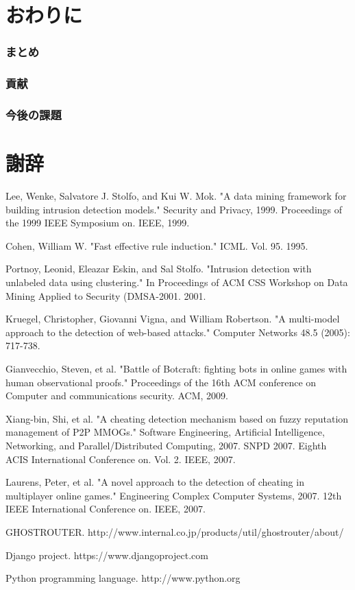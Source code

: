 \documentclass[a4paper,11pt]{jsarticle}
\begin{document}
\newpage
\part{おわりに}
\section{まとめ}
\section{貢献}
\section{今後の課題}

\newpage
\part*{謝辞}



\newpage
\begin{thebibliography}{99}

Lee, Wenke, Salvatore J. Stolfo, and Kui W. Mok. "A data mining framework for building intrusion detection models." Security and Privacy, 1999. Proceedings of the 1999 IEEE Symposium on. IEEE, 1999.

Cohen, William W. "Fast effective rule induction." ICML. Vol. 95. 1995.

Portnoy, Leonid, Eleazar Eskin, and Sal Stolfo. "Intrusion detection with unlabeled data using clustering." In Proceedings of ACM CSS Workshop on Data Mining Applied to Security (DMSA-2001. 2001.

Kruegel, Christopher, Giovanni Vigna, and William Robertson. "A multi-model approach to the detection of web-based attacks." Computer Networks 48.5 (2005): 717-738.

Gianvecchio, Steven, et al. "Battle of Botcraft: fighting bots in online games with human observational proofs." Proceedings of the 16th ACM conference on Computer and communications security. ACM, 2009.

Xiang-bin, Shi, et al. "A cheating detection mechanism based on fuzzy reputation management of P2P MMOGs." Software Engineering, Artificial Intelligence, Networking, and Parallel/Distributed Computing, 2007. SNPD 2007. Eighth ACIS International Conference on. Vol. 2. IEEE, 2007.

Laurens, Peter, et al. "A novel approach to the detection of cheating in multiplayer online games." Engineering Complex Computer Systems, 2007. 12th IEEE International Conference on. IEEE, 2007.

GHOSTROUTER. http://www.internal.co.jp/products/util/ghostrouter/about/

Django project. https://www.djangoproject.com

Python programming language. http://www.python.org

\end{thebibliography}

%
%
\end{document}
